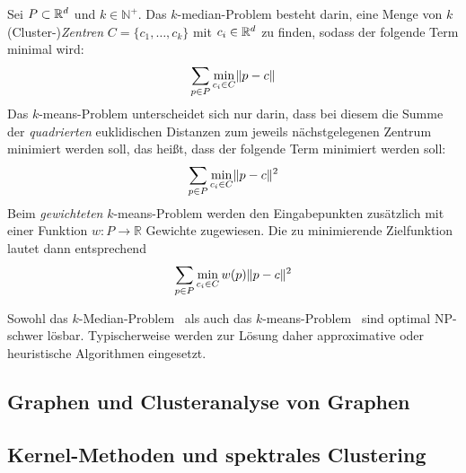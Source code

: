 \begin{definition}
Sei $P \subset \mathbb{R}^{d}$ und $k \in \mathbb{N}^{+}$. Das $k$-median-Problem besteht darin, eine Menge von $k$ (Cluster-)\emph{Zentren}
$C = \{ c_1, \dots, c_k \}$ mit $c_i \in \mathbb{R}^{d}$ zu finden, sodass der folgende Term minimal wird:
\[ \sum_{p \in P} \min_{c_i \in C} \lVert {p} - {c} \rVert \]
Das $k$-means-Problem unterscheidet sich nur darin, dass bei diesem die Summe der \emph{quadrierten} euklidischen Distanzen
zum jeweils nächstgelegenen Zentrum minimiert werden soll, das heißt, dass der folgende Term minimiert werden soll:
\[ \sum_{p \in P} \min_{c_i \in C} \lVert {p} - {c} \rVert^2 \]
Beim \emph{gewichteten} $k$-means-Problem werden den Eingabepunkten zusätzlich mit einer Funktion $w : P \rightarrow \mathbb{R}$
Gewichte zugewiesen. Die zu minimierende Zielfunktion lautet dann entsprechend
\[ \sum_{p \in P} \min_{c_i \in C} w(p) \lVert {p} - {c} \rVert^2 \]
\end{definition}
Sowohl das $k$-Median-Problem~\cite{MegiddoS84} als auch das $k$-means-Problem~\cite{AloiseDHP09} sind optimal NP-schwer lösbar.
Typischerweise werden zur Lösung daher approximative oder heuristische Algorithmen eingesetzt.

\subsection{Graphen und Clusteranalyse von Graphen}
\label{subsection:basics:graphs}

\subsection{Kernel-Methoden und spektrales Clustering}
\label{subsection:basics:kernel-spectral}